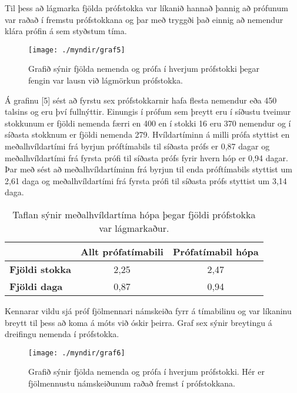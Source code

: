 \documentclass[12pt]{article}
\begin{document}
Til þess að lágmarka fjölda prófstokka var líkanið hannað þannig að prófunum var raðað í fremstu prófstokkana og þar með tryggði það einnig að nemendur klára prófin á sem styðstum tíma. 

\newpage

\begin{figure}[h]
    \centering
    \texttt{[image: ./myndir/graf5]}
    \caption{Grafið sýnir fjölda nemenda og prófa í hverjum prófstokki þegar fengin var lausn við lágmörkun prófstokka.}
\end{figure}

Á grafinu [5] sést að fyrstu sex prófstokkarnir hafa flesta nemendur eða 450 talsins og eru því fullnýttir. Einungis í prófum sem þreytt eru í síðustu tveimur stokkunum er fjöldi nemenda færri en 400 en í stokki 16 eru 370 nemendur og í síðasta stokknum er fjöldi nemenda 279.
Hvíldartíminn á milli prófa styttist en meðalhvíldartími frá byrjun próftímabils til síðasta prófs er 0,87 dagar og meðalhvíldartími frá fyrsta prófi til síðasta prófs fyrir hvern hóp er 0,94 dagar. Þar með sést að meðalhvíldartíminn frá byrjun til enda próftímabils styttist um 2,61 daga og meðalhvíldartími frá fyrsta prófi til síðasta prófs styttist um 3,14 daga. 


\begin{table}[h]
    \centering
    \begin{tabular}{l|c|c|}
        \cline{2-3}
        & \multicolumn{1}{l|}{\textbf{Allt prófatímabili}} & \multicolumn{1}{l|}{\textbf{Prófatímabil hópa}} \\ \hline
        \multicolumn{1}{|l|}{\textbf{Fjöldi stokka}} & 2,25                                             & 2,47                                            \\ \hline
        \multicolumn{1}{|l|}{\textbf{Fjöldi daga}}   & 0,87                                             & 0,94                                            \\ \hline
    \end{tabular}
    \caption{Taflan sýnir meðalhvíldartíma hópa þegar fjöldi  prófstokka var lágmarkaður.}
\end{table}

Kennarar vildu sjá próf fjölmennari námskeiða fyrr á tímabilinu og var líkaninu breytt til þess að koma á móts við óskir þeirra. Graf sex sýnir breytingu á dreifingu nemenda í prófstokka.


\begin{figure}[h]
    \centering
    \texttt{[image: ./myndir/graf6]}
    \caption{Grafið sýnir fjölda nemenda og prófa í hverjum prófstokki. Hér er fjölmennustu námskeiðunum raðað fremst í prófstokkana.}
\end{figure}
\end{document}
